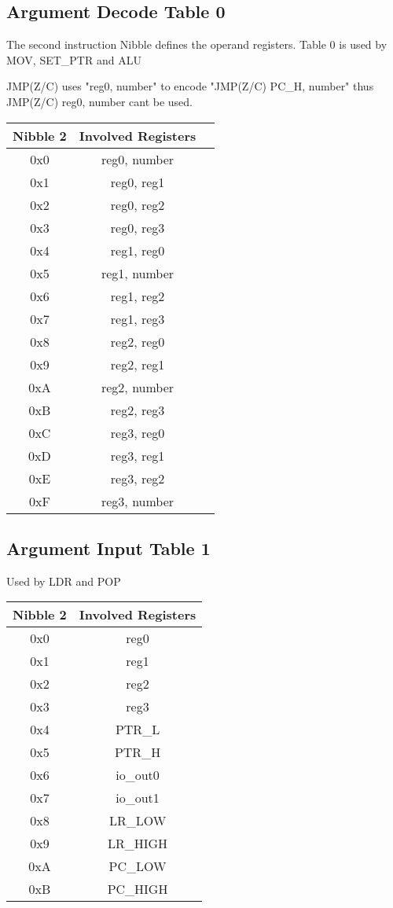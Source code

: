 \documentclass[a4paper, 12pt]{article}
\begin{document}
	\subsection{Argument Decode Table 0}
	The second instruction Nibble defines the operand registers.
	Table 0 is used by MOV, SET\_PTR and ALU
	\begin{center}
		JMP(Z/C) uses "reg0, number" to encode "JMP(Z/C) PC\_H, number" thus JMP(Z/C) reg0, number cant be used.\\
		\begin{tabular}{|c|c|p{6cm}|}
			\hline
			Nibble 2 & Involved Registers \\ \hline
			0x0 & reg0, number \\ \hline
			0x1 & reg0, reg1  \\ \hline
			0x2 & reg0, reg2 \\ \hline
			0x3 & reg0, reg3 \\ \hline
			0x4 & reg1, reg0 \\ \hline
			0x5 & reg1, number \\ \hline
			0x6 & reg1, reg2 \\ \hline
			0x7 & reg1, reg3 \\ \hline
			0x8 & reg2, reg0 \\ \hline
			0x9 & reg2, reg1 \\ \hline
			0xA & reg2, number \\ \hline
			0xB & reg2, reg3 \\ \hline
			0xC & reg3, reg0 \\ \hline
			0xD & reg3, reg1 \\ \hline
			0xE & reg3, reg2 \\ \hline
			0xF & reg3, number \\ \hline
		\end{tabular}
	\end{center}	
	\newpage
	\subsection{Argument Input Table 1}
	Used by LDR and POP
	\begin{center}
		\begin{tabular}{|c|c|}
			\hline
			Nibble 2 & Involved Registers \\ \hline
			0x0 & reg0 \\ \hline
			0x1 & reg1 \\ \hline
			0x2 & reg2 \\ \hline
			0x3 & reg3 \\ \hline
			0x4 & PTR\_L\\ \hline
			0x5 & PTR\_H \\ \hline
			0x6 & io\_out0 \\ \hline
			0x7 & io\_out1 \\ \hline
			0x8 & LR\_LOW \\ \hline
			0x9 & LR\_HIGH \\ \hline
			0xA & PC\_LOW \\ \hline
			0xB & PC\_HIGH \\ \hline
		\end{tabular}
	\end{center}	
\end{document}
